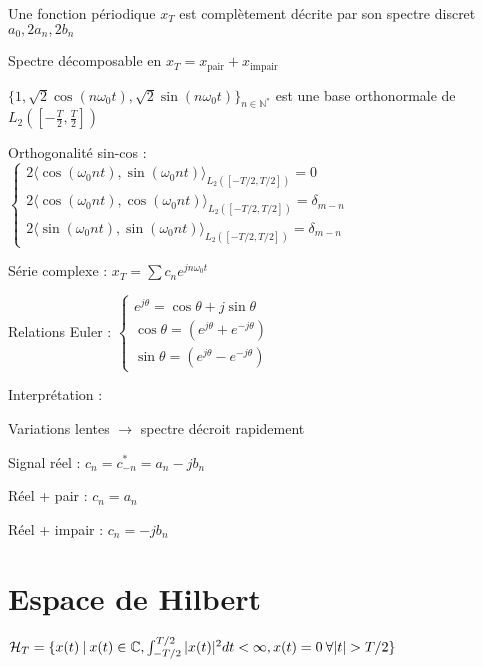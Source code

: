 \begin{myitemize}

\item Une fonction périodique $x_T$ est complètement décrite par son spectre discret $a_0, 2a_n, 2b_n$

\item Spectre décomposable en $x_T = x_{\text{pair}} + x_{\text{impair}}$

\item $\{1, \sqrt{2}\cos(n\omega_0 t), \sqrt{2}\sin(n\omega_0 t)\}_{n\in\mathbb{N}^*}$ est une base orthonormale de $L_2([-\frac{T}{2},\frac{T}{2}])$

\item Orthogonalité sin-cos : \\
$\begin{cases}
2\langle \cos(\omega_0nt), \sin(\omega_0nt) \rangle_{L_2([-T/2,T/2])} = 0 \\
2\langle \cos(\omega_0nt), \cos(\omega_0nt) \rangle_{L_2([-T/2,T/2])} = \delta_{m-n} \\
2\langle \sin(\omega_0nt), \sin(\omega_0nt) \rangle_{L_2([-T/2,T/2])} = \delta_{m-n}
\end{cases}$

\item Série complexe : $x_T = \sum c_n e^{jn\omega_0t}$

\item Relations Euler : 
$\begin{cases}
e^{j\theta} = \cos\theta + j\sin\theta \\
\cos\theta = (e^{j\theta} + e^{-j\theta})\\
\sin\theta = (e^{j\theta} - e^{-j\theta})
\end{cases}$

\item Interprétation : 
\begin{myitemize}
\item Variations lentes $\rightarrow$ spectre décroit rapidement
\item Signal réel : $c_n = c_{-n}^* = a_n - jb_n$
\item Réel + pair : $c_n=a_n$
\item Réel + impair : $c_n=-jb_n$
\end{myitemize}

\end{myitemize}



\section{Espace de Hilbert}
$
\mathcal{H}_T = \{ x(t) \:|\: x(t) \in \mathbb{C}, \int_{-T/2}^{T/2} |x(t)|^2dt < \infty, \\
 x(t) = 0 \: \forall |t| > T/2 \}
$

